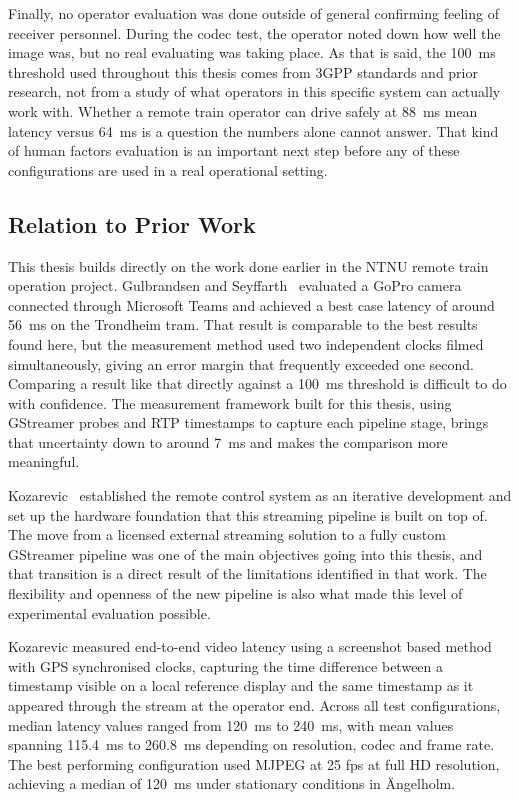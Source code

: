 Finally, no operator evaluation was done outside of general confirming feeling of receiver personnel. During the codec test, the operator noted down how well the image was, but no real evaluating was taking place. As that is said, the 100~ms threshold used throughout this thesis comes from 3GPP standards and prior research, not from a study of what operators in this specific system can actually work with. Whether a remote train operator can drive safely at 88~ms mean latency versus 64~ms is a question the numbers alone cannot answer. That kind of human factors evaluation is an important next step before any of these configurations are used in a real operational setting.

\subsection{Relation to Prior Work}\label{subsec:disc_prior_work}

This thesis builds directly on the work done earlier in the NTNU remote train operation project. Gulbrandsen and Seyffarth~\cite{gulbrandsenSeyffarth2024} evaluated a GoPro camera connected through Microsoft Teams and achieved a best case latency of around 56~ms on the Trondheim tram. That result is comparable to the best results found here, but the measurement method used two independent clocks filmed simultaneously, giving an error margin that frequently exceeded one second. Comparing a result like that directly against a 100~ms threshold is difficult to do with confidence. The measurement framework built for this thesis, using GStreamer probes and RTP timestamps to capture each pipeline stage, brings that uncertainty down to around 7~ms and makes the comparison more meaningful.
 
Kozarevic~\cite{kozarevic2025} established the remote control system as an iterative development and set up the hardware foundation that this streaming pipeline is built on top of. The move from a licensed external streaming solution to a fully custom GStreamer pipeline was one of the main objectives going into this thesis, and that transition is a direct result of the limitations identified in that work. The flexibility and openness of the new pipeline is also what made this level of experimental evaluation possible.

Kozarevic measured end-to-end video latency using a screenshot based method with GPS synchronised clocks, capturing the time difference between a timestamp visible on a local reference display and the same timestamp as it appeared through the stream at the operator end. Across all test configurations, median latency values ranged from 120~ms to 240~ms, with mean values spanning 115.4~ms to 260.8~ms depending on resolution, codec and frame rate. The best performing configuration used MJPEG at 25 fps at full HD resolution, achieving a median of 120~ms under stationary conditions in Ängelholm.

